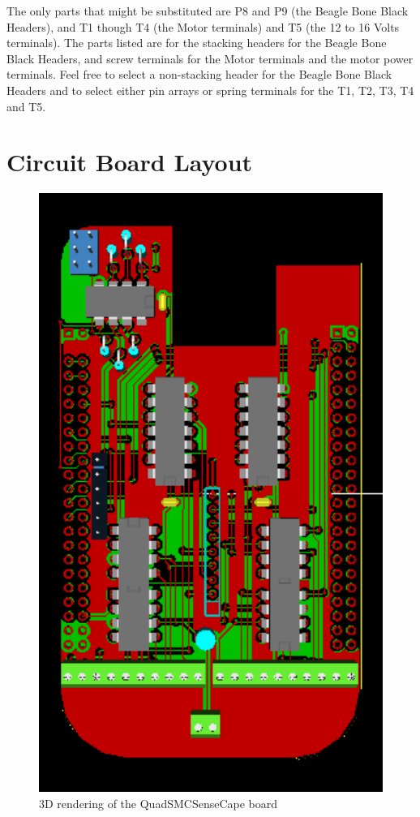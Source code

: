 The only parts that might be substituted are P8 and P9 (the Beagle Bone Black
Headers), and T1 though T4 (the Motor terminals) and T5 (the 12 to 16 Volts
terminals). The parts listed are for the stacking headers for the Beagle Bone
Black Headers, and screw terminals for the Motor terminals and the motor power
terminals. Feel free to select a non-stacking header for the Beagle Bone Black
Headers and to select either pin arrays or spring terminals for the T1, T2,
T3, T4 and T5.

\section{Circuit Board Layout}

\begin{figure}[hbpt]\begin{centering}%
\includegraphics[width=5in]{QuadSMCSenseCape3DTop.png}
\caption{3D rendering of the QuadSMCSenseCape board}
\end{centering}\end{figure}
